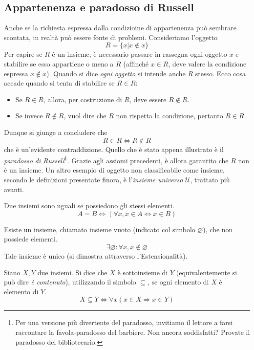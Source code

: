 \subsection*{Appartenenza e paradosso di Russell}
Anche se la richiesta espressa dalla condizioine di appartenenza può sembrare
scontata, in realtà può essere fonte di problemi. Consideriamo l'oggetto
\[ R = \{x|x\not\in x\} \]
Per capire se $R$ è un insieme, è necessario passare in rassegna ogni oggetto
$x$ e stabilire se esso appartiene o meno a $R$ (affinché $x\in R$, deve valere
la condizione espressa $x\not\in x$). Quando si dice \textit{ogni oggetto} si
intende anche $R$ stesso. Ecco cosa accade quando si tenta di stabilire se
$R\in R$:
\begin{itemize}
\item Se $R\in R$, allora, per costruzione di $R$, deve essere $R\not\in R$.
\item Se invece $R\not\in R$, vuol dire che $R$ non rispetta la condizione, pertanto $R\in R$.
\end{itemize}
Dunque si giunge a concludere che \[ R\in R \Longleftrightarrow R\not\in R \]
che è un'evidente contraddizione. Quello che è stato appena illustrato è il \textit{paradosso
di Russell}\footnote{Per una versione più divertente del paradosso, invitiamo il
lettore a farsi raccontare la favola-paradosso del barbiere. Non ancora soddisfatti? Provate il paradosso del bibliotecario.}. Grazie agli assiomi precedenti, è allora garantito che $R$ non è
un insieme. Un altro esempio di oggetto non classificabile come insieme,
secondo le definizioni presentate finora, è l'\textit{insieme universo} $\mathcal{U}$,
trattato più avanti.

\begin{tcolorbox}[colback=yellow!30, colframe=yellow!30!black, title={Assioma di Estensionalità}]
Due insiemi sono uguali se possiedono gli stessi elementi.
\[ A = B \Longleftrightarrow (\forall x,x\in A \Leftrightarrow x \in B) \]
\end{tcolorbox}

\begin{tcolorbox}[colback=yellow!30, colframe=yellow!30!black, title=Esistenza dell'insieme vuoto]
Esiste un insieme, chiamato insieme vuoto (indicato col simbolo $\varnothing$), che non possiede elementi.
\[\exists \varnothing:\forall x, x\not\in\varnothing\]
Tale insieme è unico (si dimostra attraverso l'Estensionalità).
\end{tcolorbox}

\begin{tcolorbox}[colback=yellow!30, colframe=yellow!30!black, title={Sottoinsiemi}]
Siano $X,Y$ due insiemi. Si dice che $X$ è sottoinsieme di $Y$
(equivalentemente si può dire \emph{è contenuto}), utilizzando il simbolo $\subseteq$,
se ogni elemento di $X$ è elemento di $Y$.
\[ X \subseteq Y \Longleftrightarrow \forall x(x\in X \Rightarrow x\in Y) \]
\end{tcolorbox}

